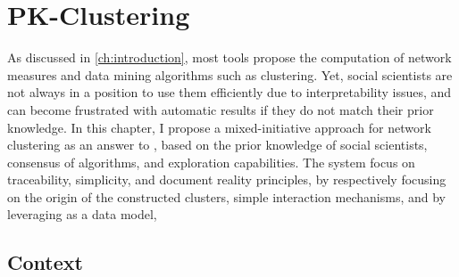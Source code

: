 \chapter{PK-Clustering}\label{ch:pk-clustering}
\minitoc

As discussed in \autoref{ch:introduction}, most \sna tools propose the computation of network measures and data mining algorithms such as clustering.
Yet, social scientists are not always in a position to use them efficiently due to interpretability issues, and can become frustrated with automatic results if they do not match their prior knowledge.
In this chapter, I propose a mixed-initiative approach for network clustering as an answer to \qthree, based on
the prior knowledge of social scientists, consensus of algorithms, and exploration capabilities.
The system focus on traceability, simplicity, and document reality principles, by respectively focusing on the origin of the constructed clusters, simple interaction mechanisms, and by leveraging \modelplural as a data model,


\section{Context}

